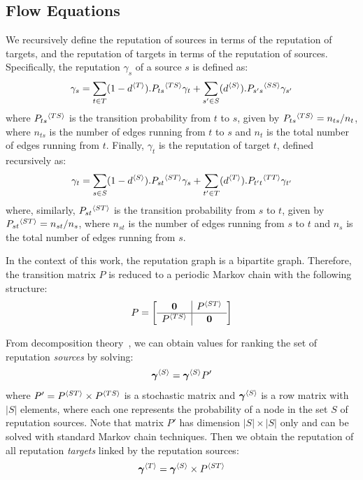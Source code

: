 \documentclass[notitlepage]{svjour3}
\begin{document}
\subsection{Flow Equations}\label{sec:flow-equations}

We recursively define the reputation of sources in terms of the reputation of targets, and the reputation of targets in terms of the reputation of sources. Specifically, the reputation $\gamma_s$ of a source $s$ is defined as:
\begin{align}
  \gamma_s = \sum_{t \in T} (1-d{^{\langle T \rangle}}).P_{ts}{^{\langle TS \rangle}} \gamma_t + \sum_{s' \in S} (d{^{\langle S \rangle}}).P_{s's}{^{\langle SS \rangle}} \gamma_{s'}\label{eqn:gs}
\end{align}
where $P_{ts}{^{\langle TS \rangle}}$ is the transition probability from $t$ to $s$, given by $P_{ts}{^{\langle TS \rangle}} = n_{ts} / n_t$, where $n_{ts}$ is the number of edges running from $t$ to $s$ and $n_t$ is the total number of edges running from $t$. Finally, $\gamma_t$ is the reputation of target $t$, defined recursively as:
\begin{align}
  \gamma_t = \sum_{s \in S} (1-d{^{\langle S \rangle}}).P_{st}{^{\langle ST \rangle}} \gamma_s + \sum_{t' \in T} (d{^{\langle T \rangle}}).P_{t't}{^{\langle TT \rangle}} \gamma_{t'}\label{eqn:gt}
\end{align}
where, similarly, $P_{st}{^{\langle ST \rangle}}$ is the transition probability from $s$ to $t$, given by $P_{st}{^{\langle ST \rangle}} = n_{st} / n_s$, where $n_{st}$ is the number of edges running from $s$ to $t$ and $n_s$ is the total number of edges running from $s$. 


In the context of this work, the reputation graph is a bipartite graph. Therefore, the transition matrix $P$ is reduced to a periodic Markov chain with the following structure:
\begin{align}\label{eq:p}
P 
=
\left[
\begin{array}{c | c}
{\bf 0}      &P{^{\langle ST \rangle}} \\
\hline
P{^{\langle TS \rangle}}  &{\bf 0}    \\
\end{array}
\right]
\end{align}

From decomposition theory~\cite{meyer89}, we can obtain values for ranking the set of reputation {\em sources} by solving:
\begin{align}
\label{eq:top-rank}
{\mbox{\boldmath $\gamma$}}{^{\langle S \rangle}} = {\mbox{\boldmath $\gamma$}}{^{\langle S \rangle}} P'
\end{align}
\noindent where $P^\prime = P{^{\langle ST \rangle}} \times P{^{\langle TS \rangle}}$ is a stochastic matrix and ${\mbox{\boldmath $\gamma$}}{^{\langle S \rangle}}$ is a row matrix with $|S|$ elements, where each one represents the probability of a node in the set $S$ of reputation sources.
%
Note that matrix $P'$ has dimension $|S| \times |S|$ only and can be solved with standard Markov chain techniques.
Then we obtain the reputation of all reputation \emph{targets} linked by the reputation sources:
\begin{align}
\label{eq:venue-rank}
{\mbox{\boldmath $\gamma$}}{^{\langle T \rangle}} = {\mbox{\boldmath $\gamma$}}{^{\langle S \rangle}} \times P{^{\langle ST \rangle}}
\end{align}
\end{document}
